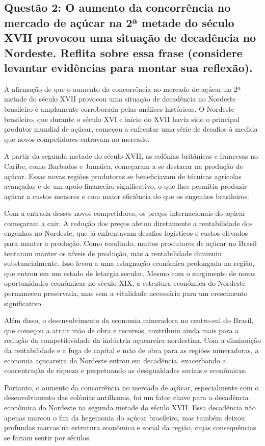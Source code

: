 \documentclass[a4paper,12pt]{article}[abntex2]
\begin{document}
\subsection{\textbf{Questão 2: O aumento da concorrência no mercado de açúcar na 2ª metade do século XVII provocou uma situação de decadência no Nordeste. Reflita sobre essa frase (considere levantar evidências para montar sua reflexão).}}

A afirmação de que o aumento da concorrência no mercado de açúcar na 2ª metade do século XVII provocou uma situação de decadência no Nordeste brasileiro é amplamente corroborada pelas análises históricas. O Nordeste brasileiro, que durante o século XVI e início do XVII havia sido o principal produtor mundial de açúcar, começou a enfrentar uma série de desafios à medida que novos competidores entravam no mercado.

A partir da segunda metade do século XVII, as colônias britânicas e francesas no Caribe, como Barbados e Jamaica, começaram a se destacar na produção de açúcar. Essas novas regiões produtoras se beneficiavam de técnicas agrícolas avançadas e de um apoio financeiro significativo, o que lhes permitia produzir açúcar a custos menores e com maior eficiência do que os engenhos brasileiros.

Com a entrada desses novos competidores, os preços internacionais do açúcar começaram a cair. A redução dos preços afetou diretamente a rentabilidade dos engenhos no Nordeste, que já enfrentavam desafios logísticos e custos elevados para manter a produção. Como resultado, muitos produtores de açúcar no Brasil tentaram manter os níveis de produção, mas a rentabilidade diminuiu substancialmente. Isso levou a uma estagnação econômica prolongada na região, que entrou em um estado de letargia secular. Mesmo com o surgimento de novas oportunidades econômicas no século XIX, a estrutura econômica do Nordeste permaneceu preservada, mas sem a vitalidade necessária para um crescimento significativo.

Além disso, o desenvolvimento da economia mineradora no centro-sul do Brasil, que começou a atrair mão de obra e recursos, contribuiu ainda mais para a redução da competitividade da indústria açucareira nordestina. Com a diminuição da rentabilidade e a fuga de capital e mão de obra para as regiões mineradoras, a economia açucareira do Nordeste entrou em decadência, exacerbando a concentração de riqueza e perpetuando as desigualdades sociais e econômicas.

Portanto, o aumento da concorrência no mercado de açúcar, especialmente com o desenvolvimento das colônias antilhanas, foi um fator chave para a decadência econômica do Nordeste na segunda metade do século XVII. Essa decadência não apenas marcou o fim da hegemonia do açúcar brasileiro, mas também deixou profundas marcas na estrutura econômica e social da região, cujas consequências se fariam sentir por séculos.
\end{document}
